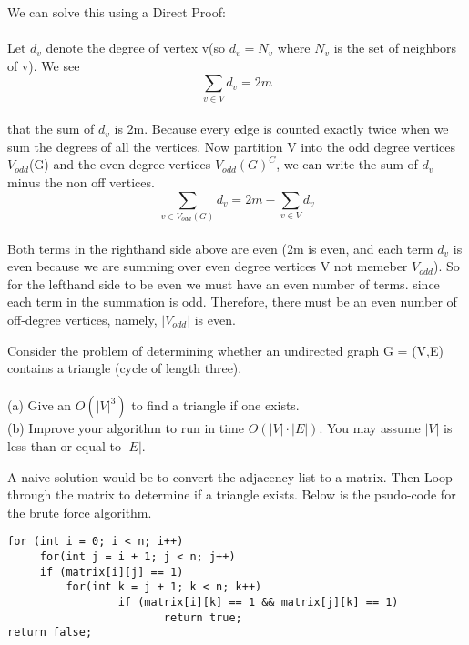 \documentclass[10pt]{article}
\newenvironment{exercise}[2][Exercise]{\begin{trivlist}
\item[\hskip \labelsep {\bfseries #1}\hskip \labelsep {\bfseries #2.}]}{\end{trivlist}}
\newenvironment{solution}[2][Solution]{\begin{trivlist}
\item[\hskip \labelsep {\bfseries #1}\hskip \labelsep {\bfseries #2.}]}{\end{trivlist}}
\theoremstyle{definition}
\begin{document}
\begin{solution}{(3)}
We can solve this using a Direct Proof:\\
\\
Let $d_v$ denote the degree of vertex v(so $d_v = N_v$ where $N_v$ is the set of neighbors of v). We see\\
$$\sum_{v \in V} d_v = 2m$$ \\
that the sum of $d_v$ is 2m. Because every edge is counted exactly twice when we sum the degrees of all the vertices. Now partition V into the odd degree vertices $V_{odd}$(G) and the even degree vertices $V_{odd}$$(G)^C$, we can write the sum of $d_v$ minus the non off vertices.\\
$$\sum_{v \in V_{odd}(G)} d_v = 2m - \sum_{v \in V} d_v$$\\
Both terms in the righthand side above are even (2m is even, and each term $d_v$ is even because we are summing over even degree vertices V not memeber $V_{odd}$). So for the lefthand side to be even we must have an even number of terms. since each term in the summation is odd. Therefore, there must be an even number of off-degree vertices, namely, $|V_{odd}|$ is even.
\end{solution}


\begin{exercise}{(4)}
Consider the problem of determining whether an undirected graph G = (V,E) contains a
triangle (cycle of length three).\\
\\
(a) Give an $O(|V |^3)$ to find a triangle if one exists.\\
(b) Improve your algorithm to run in time $O(|V |·|E|)$. You may assume $|V |$ is less than or equal to $|E|$.\\
\end{exercise}

\begin{solution}{(4a)}
A naive solution would be to convert the adjacency list to a matrix. Then Loop through the matrix to determine if a triangle exists. Below is the psudo-code for the brute force algorithm.\\
\begin{verbatim}
for (int i = 0; i < n; i++)
     for(int j = i + 1; j < n; j++)
     if (matrix[i][j] == 1)
         for(int k = j + 1; k < n; k++)
                 if (matrix[i][k] == 1 && matrix[j][k] == 1)
                        return true;
return false;
\end{verbatim}

\end{solution}
\end{document}
